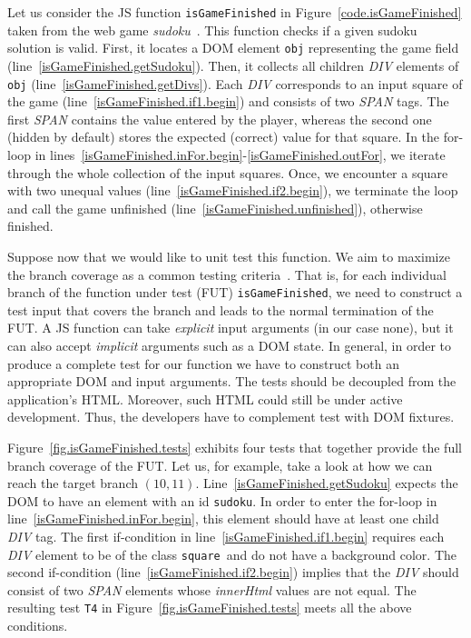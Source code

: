 Let us consider the JS function \texttt{isGameFinished} in Figure~\ref{code.isGameFinished} taken from the web game \emph{sudoku}~\cite{sudoku}. This function checks if a given sudoku solution is valid. First, it locates a DOM element \texttt{obj} representing the game field (line~\ref{isGameFinished.getSudoku}). Then, it collects all children \emph{DIV} elements of \texttt{obj} (line~\ref{isGameFinished.getDivs}). Each \emph{DIV} corresponds to an input square of the game (line~\ref{isGameFinished.if1.begin}) and consists of two \emph{SPAN} tags. The first \emph{SPAN} contains the value entered by the player, whereas the second one (hidden by default) stores the expected (correct) value for that square. In the for-loop in lines~\ref{isGameFinished.inFor.begin}-\ref{isGameFinished.outFor}, we iterate through the whole collection of the input squares. Once, we encounter a square with two unequal values (line~\ref{isGameFinished.if2.begin}), we terminate the loop and call the game unfinished (line~\ref{isGameFinished.unfinished}), otherwise finished.

Suppose now that we would like to unit test this function. We aim to maximize the branch coverage as a common testing criteria~\cite{zhu1997software}. That is, for each individual branch of the function under test (FUT) \texttt{isGameFinished}, we need to construct a test input that covers the branch and leads to the normal termination of the FUT. A JS function can take \emph{explicit} input arguments (in our case none), but it can also accept \emph{implicit} arguments such as a DOM state. In general, in order to produce a complete test for our function we have to construct both an appropriate DOM and input arguments. The tests should be decoupled from the application's HTML. Moreover, such HTML could still be under active development. Thus, the developers have to complement test with DOM fixtures.


Figure~\ref{fig.isGameFinished.tests} exhibits four tests that together provide the full branch coverage of the FUT. Let us, for example, take a look at how we can reach the target branch $(10,11)$. Line~\ref{isGameFinished.getSudoku} expects the DOM to have an element with an id \textquotesingle\texttt{sudoku}\textquotesingle. In order to enter the for-loop in line~\ref{isGameFinished.inFor.begin}, this element should have at least one child \emph{DIV} tag. The first if-condition in line~\ref{isGameFinished.if1.begin} requires each \emph{DIV} element to be of the class \textquotesingle\texttt{square}\textquotesingle\, and do not have a background color. The second if-condition (line~\ref{isGameFinished.if2.begin}) implies that the \emph{DIV} should consist of two \emph{SPAN} elements whose \emph{innerHtml} values are not equal. The resulting test \texttt{T4} in Figure~\ref{fig.isGameFinished.tests} meets all the above conditions.

